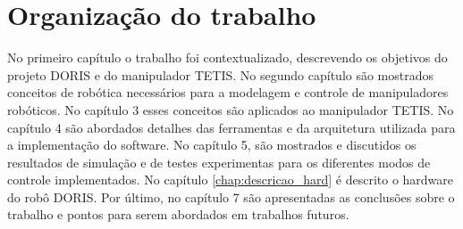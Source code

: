 \section{Organização do trabalho}

No primeiro capítulo o trabalho foi contextualizado, descrevendo os objetivos do projeto DORIS e do manipulador TETIS. No segundo capítulo são mostrados conceitos de robótica necessários para a modelagem e controle de manipuladores robóticos. No capítulo 3 esses conceitos são aplicados ao manipulador TETIS. No capítulo 4 são abordados detalhes das ferramentas e da arquitetura utilizada para a implementação do software. No capítulo 5, são mostrados e discutidos os resultados de simulação e de testes experimentas para os diferentes modos de controle implementados. No capítulo \ref{chap:descricao_hard} é descrito o hardware do robô DORIS. 
Por último, no capítulo 7 são apresentadas as conclusões sobre o trabalho e pontos para serem abordados em trabalhos futuros.

